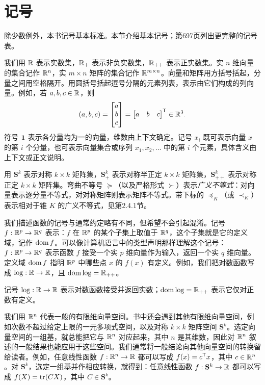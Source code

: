 \section{记号}
除少数例外，本书记号基本标准。本节介绍基本记号；第697页列出更完整的记号表。

我们用 $\mathbb R$ 表示实数集，$\mathbb R_+$ 表示非负实数集，$\mathbb R_{++}$ 表示正实数集。实 $n$ 维向量的集合记作 $\mathbb R^n$，实 $m\times n$ 矩阵的集合记作 $\mathbb R^{m\times n}$。向量和矩阵用方括号括起，分量之间用空格隔开。用圆括号括起逗号分隔的元素列表，表示由它们构成的列向量。例如，若 $a,b,c\in\mathbb R$，则
\[
 (a,b,c)=\begin{bmatrix}a\\b\\c\end{bmatrix}
 =\begin{bmatrix}a&b&c\end{bmatrix}^{\mathsf T}\in\mathbb R^3.
\]
符号 $\mathbf 1$ 表示各分量均为一的向量，维数由上下文确定。记号 $x_i$ 既可表示向量 $x$ 的第 $i$ 个分量，也可表示向量集合或序列 $x_1,x_2,\ldots$ 中的第 $i$ 个元素，具体含义由上下文或正文说明。

用 $\mathbf S^k$ 表示对称 $k\times k$ 矩阵集，$\mathbf S_+^k$ 表示对称半正定 $k\times k$ 矩阵集，$\mathbf S_{++}^k$ 表示对称正定 $k\times k$ 矩阵集。弯曲不等号 $\succeq$（以及严格形式 $\succ$）表示\emph{广义不等式}：对向量表示逐分量不等式，对对称矩阵则表示矩阵不等式。带下标的 $\preceq_K$（或 $\prec_K$）表示相对于锥 $K$ 的广义不等式，见第2.4.1节。

我们描述函数的记号与通常约定略有不同，但希望不会引起混淆。记号 $f:\mathbb R^p\to\mathbb R^q$ 表示：$f$ 在 $\mathbb R^p$ 的某个子集上取值于 $\mathbb R^q$，这个子集就是它的定义域，记作 $\operatorname{dom} f$。可以像计算机语言中的类型声明那样理解这个记号：$f:\mathbb R^p\to\mathbb R^q$ 表示函数 $f$ 接受一个实 $p$ 维向量作为输入，返回一个实 $q$ 维向量。定义域 $\operatorname{dom} f$ 指明 $\mathbb R^p$ 中哪些点 $x$ 的 $f(x)$ 有定义。例如，我们把对数函数写成 $\log:\mathbb R\to\mathbb R$，且 $\operatorname{dom}\log=\mathbb R_{++}$。

记号 $\log:\mathbb R\to\mathbb R$ 表示对数函数接受并返回实数；$\operatorname{dom}\log=\mathbb R_{++}$ 表示它仅对正数有定义。

我们用 $\mathbb R^n$ 代表一般的有限维向量空间。书中还会遇到其他有限维向量空间，例如次数不超过给定上限的一元多项式空间，以及对称 $k\times k$ 矩阵空间 $\mathbf S^k$。选定向量空间的一组基，就总能把它与 $\mathbb R^n$ 对应起来，其中 $n$ 是其维数，因此对 $\mathbb R^n$ 叙述的一般结果也能应用于这些空间。我们通常将一般结论向其他向量空间的转换留给读者。例如，任意线性函数 $f:\mathbb R^n\to\mathbb R$ 都可以写成 $f(x)=c^{\mathsf T}x$，其中 $c\in\mathbb R^n$。对 $\mathbf S^k$，选定一组基并作相应转换，就得到：任意线性函数 $f:\mathbf S^k\to\mathbb R$ 都可以写成 $f(X)=\operatorname{tr}(CX)$，其中 $C\in\mathbf S^k$。

